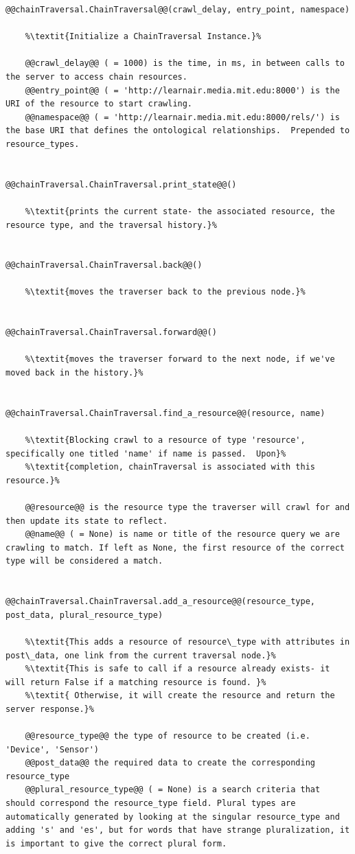 \begin{lstlisting}[style=codedef]
@@chainTraversal.ChainTraversal@@(crawl_delay, entry_point, namespace)
	
	%\textit{Initialize a ChainTraversal Instance.}%

	@@crawl_delay@@ ( = 1000) is the time, in ms, in between calls to the server to access chain resources.
	@@entry_point@@ ( = 'http://learnair.media.mit.edu:8000') is the URI of the resource to start crawling.
	@@namespace@@ ( = 'http://learnair.media.mit.edu:8000/rels/') is the base URI that defines the ontological relationships.  Prepended to resource_types. 


@@chainTraversal.ChainTraversal.print_state@@()
	
	%\textit{prints the current state- the associated resource, the resource type, and the traversal history.}%
	

@@chainTraversal.ChainTraversal.back@@()
	
	%\textit{moves the traverser back to the previous node.}%


@@chainTraversal.ChainTraversal.forward@@()
	
	%\textit{moves the traverser forward to the next node, if we've moved back in the history.}%


@@chainTraversal.ChainTraversal.find_a_resource@@(resource, name)
	
	%\textit{Blocking crawl to a resource of type 'resource', specifically one titled 'name' if name is passed.  Upon}%
	%\textit{completion, chainTraversal is associated with this resource.}%

	@@resource@@ is the resource type the traverser will crawl for and then update its state to reflect.
	@@name@@ ( = None) is name or title of the resource query we are crawling to match. If left as None, the first resource of the correct type will be considered a match.
	

@@chainTraversal.ChainTraversal.add_a_resource@@(resource_type, post_data, plural_resource_type)
	
	%\textit{This adds a resource of resource\_type with attributes in post\_data, one link from the current traversal node.}%
	%\textit{This is safe to call if a resource already exists- it will return False if a matching resource is found. }%
	%\textit{ Otherwise, it will create the resource and return the server response.}%  

	@@resource_type@@ the type of resource to be created (i.e. 'Device', 'Sensor')
	@@post_data@@ the required data to create the corresponding resource_type
	@@plural_resource_type@@ ( = None) is a search criteria that should correspond the resource_type field. Plural types are automatically generated by looking at the singular resource_type and adding 's' and 'es', but for words that have strange pluralization, it is important to give the correct plural form. 
	


\end{lstlisting}
